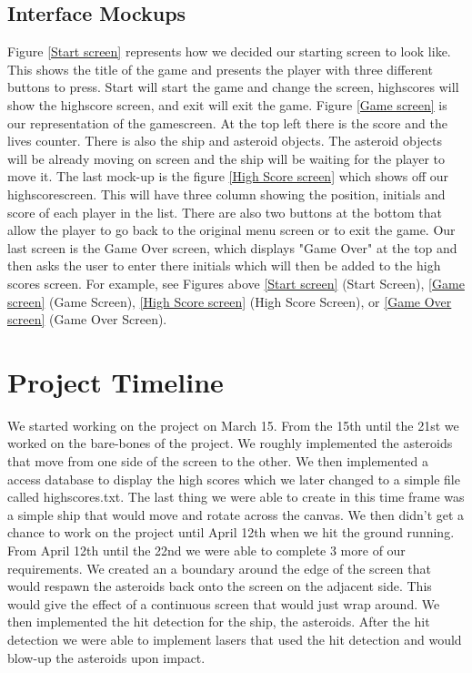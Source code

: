 \documentclass[10pt,conference,onecolumn,compsoc]{IEEEtran}
\begin{document}
\subsection{Interface Mockups}
Figure \ref{Start screen} represents how we decided our starting screen to look like. This shows the title of the game and presents the player with three different buttons to press. Start will start the game and change the screen, highscores will show the highscore screen, and exit will exit the game. Figure \ref{Game screen} is our representation of the gamescreen. At the top left there is the score and the lives counter. There is also the ship and asteroid objects. The asteroid objects will be already moving on screen and the ship will be waiting for the player to move it. The last mock-up is the figure \ref{High Score screen} which shows off our highscorescreen. This will have three column showing the position, initials and score of each player in the list. There are also two buttons at the bottom that allow the player to go back to the original menu screen or to exit the game. Our last screen is the Game Over screen, which displays "Game Over" at the top and then asks the user to enter there initials which will then be added to the high scores screen.  For example, see Figures above \ref{Start screen} (Start Screen), \ref{Game screen} (Game Screen), \ref{High Score screen} (High Score Screen), or \ref{Game Over screen} (Game Over Screen).

\section{Project Timeline}
We started working on the project on March 15. From the 15th until the 21st we worked on the bare-bones of the project. We roughly implemented the asteroids that move from one side of the screen to the other. We then implemented a access database to display the high scores which we later changed to a simple file called highscores.txt. The last thing we were able to create in this time frame was a simple ship that would move and rotate across the canvas. We then didn't get a chance to work on the project until April 12th when we hit the ground running. From April 12th until the 22nd we were able to complete 3 more of our requirements. We created an a boundary around the edge of the screen that would respawn the asteroids back onto the screen on the adjacent side. This would give the effect of a continuous screen that would just wrap around. We then implemented the hit detection for the ship, the asteroids. After the hit detection we were able to implement lasers that used the hit detection and would blow-up the asteroids upon impact. 
\end{document}
